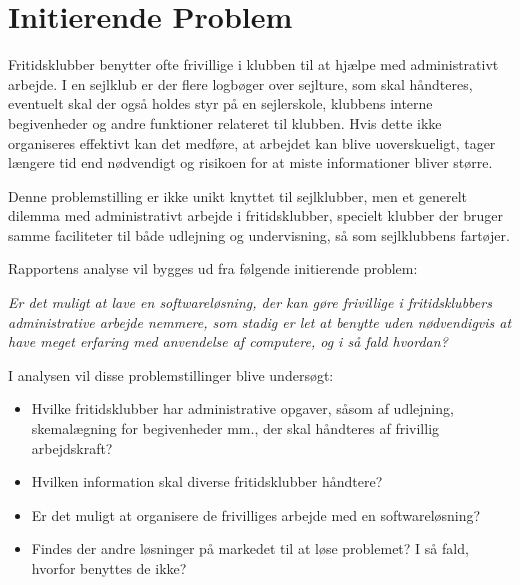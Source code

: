 \section{Initierende Problem}

Fritidsklubber benytter ofte frivillige i klubben til at hjælpe med administrativt arbejde.  I en sejlklub er der flere
logbøger over sejlture, som skal håndteres, eventuelt skal der også holdes styr på en sejlerskole, klubbens interne
begivenheder og andre funktioner relateret til klubben. Hvis dette ikke organiseres effektivt kan det medføre, at
arbejdet kan blive uoverskueligt, tager længere tid end nødvendigt og risikoen for at miste informationer bliver større.

Denne problemstilling er ikke unikt knyttet til sejlklubber, men et generelt dilemma med administrativt
arbejde i fritidsklubber, specielt klubber der bruger samme faciliteter til både udlejning og undervisning, så
som sejlklubbens fartøjer.

Rapportens analyse vil bygges ud fra følgende initierende problem:

\textit{Er det muligt at lave en softwareløsning, der kan gøre frivillige i fritidsklubbers administrative
arbejde nemmere, som stadig er let at benytte uden nødvendigvis at have meget erfaring med anvendelse af
computere, og i så fald hvordan?}

I analysen vil disse problemstillinger blive undersøgt:

\begin{itemize}
  \item Hvilke fritidsklubber har administrative opgaver, såsom af udlejning, skemalægning for begivenheder mm., der
        skal håndteres af frivillig arbejdskraft?
  \item Hvilken information skal diverse fritidsklubber håndtere?
  \item Er det muligt at organisere de frivilliges arbejde med en softwareløsning?
  \item Findes der andre løsninger på markedet til at løse problemet? I så fald, hvorfor benyttes de ikke?
\end{itemize}